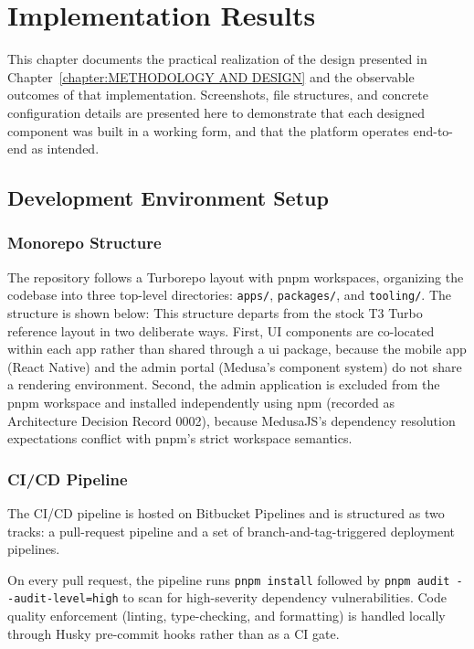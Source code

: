 \chapter{Implementation Results}

This chapter documents the practical realization of the design presented in Chapter~\ref{chapter:METHODOLOGY AND DESIGN} and the observable outcomes of that implementation. Screenshots, file structures, and concrete configuration details are presented here to demonstrate that each designed component was built in a working form, and that the platform operates end-to-end as intended.

\section{Development Environment Setup}

\subsection{Monorepo Structure}
\label{subsection:Monorepo Structure}
The repository follows a Turborepo layout with pnpm workspaces, organizing the codebase into three top-level directories: \texttt{apps/}, \texttt{packages/}, and \texttt{tooling/}. The structure is shown below:
This structure departs from the stock T3 Turbo reference layout in two deliberate ways. First, UI components are co-located within each app rather than shared through a ui package, because the mobile app (React Native) and the admin portal (Medusa's component system) do not share a rendering environment. Second, the admin application is excluded from the pnpm workspace and installed independently using npm (recorded as Architecture Decision Record 0002), because MedusaJS's dependency resolution expectations conflict with pnpm's strict workspace semantics.

\subsection{CI/CD Pipeline}
The CI/CD pipeline is hosted on Bitbucket Pipelines and is structured as two tracks: a pull-request pipeline and a set of branch-and-tag-triggered deployment pipelines.

On every pull request, the pipeline runs \texttt{pnpm install} followed by \texttt{pnpm audit -{}-audit-level=high} to scan for high-severity dependency vulnerabilities. Code quality enforcement (linting, type-checking, and formatting) is handled locally through Husky pre-commit hooks rather than as a CI gate.

